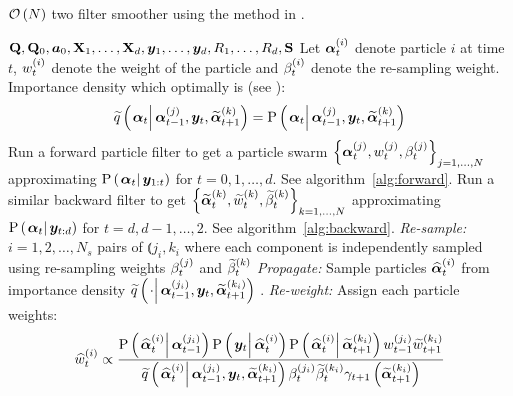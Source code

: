 \begin{algorithm}
\caption{$\mathcal{O}\left( N\right)$ two filter smoother using the method in \cite{fearnhead10}.}\label{alg:ONsmoother}
\begin{algorithmic}[1]\raggedright
\INPUT
\Statex $\mathbf{Q},\mathbf{Q}_0,\bm{a}_0,\mathbf{X}_1,\dots,\mathbf{X}_d,\bm{y}_1,\dots,\bm{y}_d,R_1,\dots,R_d,\mathbf{S}$
%
\Statex Let $\bm{\alpha}_{t}^{\left( i\right)}$ denote particle $i$ at time $t$, $w_{t}^{\left( i\right)}$ denote the weight of the particle and $\beta_{t}^{\left( i\right)}$ denote the re-sampling weight.
%
\Statex Importance density which optimally is (see \citet[page 453]{fearnhead10}): 
\Statex \begin{equation}
	\IDAproxC{\vec{\alpha}_t}{\partic{\vec{\alpha}}{t-1}{j},\vec{y}_t, \particB{\vec{\alpha}}{t+1}{k}} = 
%
	\propC{\vec{\alpha}_t}{\partic{\vec{\alpha}}{t-1}{j},\vec{y}_t, \particB{\vec{\alpha}}{t+1}{k}}
\end{equation}
%
\State Run a forward particle filter to get a particle swarm %
	$\left\{ \bm{\alpha}_{t}^{\left( j\right)}, w_{t}^{\left( j\right)}, \beta_{t}^{\left( j\right)}\right\}_{j=1,\dots,N}$ %
	approximating $\propC{\vec{\alpha}_t}{\vec{y}_{1:t}}$ for $t = 0, 1, \dots, d$. See algorithm~\ref{alg:forward}.
\EndProcedure
%
\State Run a similar backward filter to get %
	$\left\{ \widetilde{\bm{\alpha}}_{t}^{\left( k\right)}, \widetilde{w}_{t}^{\left( k\right)}, \widetilde{\beta}_{t}^{\left( k\right)}\right\}_{k=1,\dots,N}$  %
	approximating $\propC{\vec{\alpha}_t}{\vec{y}_{t:d}}$ for $t = d, d-1, \dots , 2$. See algorithm~\ref{alg:backward}.
\EndProcedure
% 
\StateXX \emph{Re-sample:}
\State $i=1,2,\dots,N_s$ pairs of $\Lparen{j_i, k_i}$ where each component is independently sampled using re-sampling weights $\beta_{t}^{\left( j\right)}$ and $\widetilde{\beta}_{t}^{\left( k\right)}$
%
\StateXX \emph{Propagate:} 
\State Sample particles $\widehat{\bm{\alpha}}_{t}^{\left( i\right)}$ from importance density %
	$\IDAproxC{\cdot}{\partic{\vec{\alpha}}{t-1}{j_i},\vec{y}_t, \particB{\vec{\alpha}}{t + 1}{k_i}}$
.%
\StateXX \emph{Re-weight:}
\State Assign each particle weights:
\StateXX \begin{equation}\label{eqn:combineWeight}
 \particS{w}{t}{i} \propto \frac{
 	\propC{\particS{\vec{\alpha}}{t}{i}}{\partic{\vec{\alpha}}{t - 1}{j_i}}
 	\propC{\vec{y}_t}{\particS{\vec{\alpha}}{t}{i}}
 	\propC{\particS{\vec{\alpha}}{t}{i}}{\particB{\vec{\alpha}}{t + 1}{k_i}}
 	\partic{w}{t - 1}{j_i}\particB{w}{t + 1}{k_i}
 	}{ %
 	\IDAproxC{\particS{\vec{\alpha}}{t}{i}}{\partic{\vec{\alpha}}{t-1}{j_i},\vec{y}_t, \particB{\vec{\alpha}}{t+1}{k_i}}
 	\partic{\beta}{t}{j_i}\particB{\beta}{t}{k_i}\gamma_{t +1}\Lparen{\particB{\vec{\alpha}}{t+1}{k_i}}
 	} %
\end{equation}
\EndFor
\EndProcedure
\end{algorithmic}
\end{algorithm}



